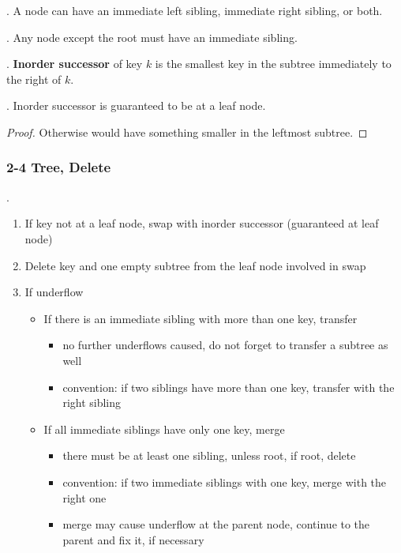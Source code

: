 \documentclass{article}
\begin{document}
\begin{deff}.
    A node can have an immediate left sibling, immediate right sibling, or both. 
    \begin{comm}[].
        Any node except the root must have an immediate sibling. 
    \end{comm}
\end{deff}

\begin{deff}.
    \textbf{Inorder successor} of key $k$ is the smallest key in the subtree immediately to the right of $k$. 
\end{deff}

\begin{discovery}[].
    Inorder successor is guaranteed to be at a leaf node. 
\end{discovery}

\begin{proof}
    Otherwise would have something smaller in the leftmost subtree. 
\end{proof}

\subsubsection{2-4 Tree, Delete} 

\begin{result}[].
    \begin{enumerate}
        \item If key not at a leaf node, swap with inorder successor (guaranteed at leaf node) 
        \item Delete key and one empty subtree from the leaf node involved in swap 
        \item If underflow \begin{itemize}
            \item If there is an immediate sibling with more than one key, transfer \begin{itemize}
                \item no further underflows caused, do not forget to transfer a subtree as well 
                \item convention: if two siblings have more than one key, transfer with the right sibling
            \end{itemize}
            \item If all immediate siblings have only one key, merge 
            \begin{itemize}
                \item there must be at least one sibling, unless root, if root, delete 
                \item convention: if two immediate siblings with one key, merge with the right one 
                \item merge may cause underflow at the parent node, continue to the parent and fix it, if necessary
            \end{itemize}
        \end{itemize}
    \end{enumerate}
\end{result}
\end{document}
